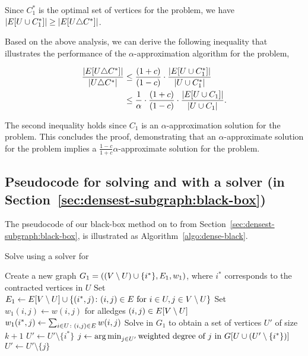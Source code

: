 Since $C_1^*$ is the optimal set of vertices for the \kdense problem, we have $\lvert E[U \cup C_1^*]\rvert \geq \lvert E[U \triangle C^*]\rvert$.

Based on the above analysis, we can derive the following inequality that illustrates the performance of the $\alpha$-approximation algorithm for the \kdense problem,

\begin{equation}
\begin{aligned}
\frac{\lvert E[U \triangle C^*]\rvert}{\lvert U \triangle C^*\rvert} 
&\leq \frac{(1+c)}{(1-c)} \cdot \frac{\lvert E[U \cup C_1^*]\rvert}{\lvert U \cup C_1^*\rvert} \\
&\leq \frac{1}{\alpha} \cdot \frac{(1+c)}{(1-c)} \cdot \frac{\lvert E[U \cup C_1]\rvert}{\lvert U \cup C_1\rvert} .\\
\end{aligned}
\end{equation}

The second inequality holds since $C_1$ is an $\alpha$-approximation solution for the \kdense problem. 
This concludes the proof, demonstrating that an $\alpha$-approximate solution for the \kdense problem implies a $\frac{1-c}{1+c}\alpha$-approximate solution for the \dskc problem.

\subsection{Pseudocode for solving \kdense and \dskc with a \dks solver (in Section~\ref{sec:densest-subgraph:black-box})}
\label{appendix:densest-subgraph:black-box:pseudocode}

The pseudocode of our black-box method on \kdense to \dks
from Section~\ref{sec:densest-subgraph:black-box}, 
is illustrated as Algorithm~\ref{algo:dense-black}.

\begin{algorithm}[H]
\caption{Solve \kdense using a solver for \dks}
\label{algo:dense-black}
\begin{algorithmic}[1]
\State Create a new graph $G_1 = ((V\setminus U)\cup \{i^*\}, E_1, w_1)$,
	where $i^*$ corresponds to the contracted vertices in $U$  
\State Set $E_1 \gets E[V\setminus U] \cup \{ (i^*,j) \colon (i,j)\in E \text{ for } i\in U, j\in V\setminus U\}$
\State Set $w_1(i,j) \gets w(i,j)$ for alledges $(i,j) \in E[V \setminus U]$
\State $w_1(i^*,j) \gets \sum_{i\in U \colon (i,j)\in E} w(i,j)$
\EndFor
\State Solve \dksplus in $G_1$ to obtain a set of vertices $U'$ of size $k+1$
\State $U' \gets U'\setminus \{i^*\}$
\Else
\State $j \gets \operatorname*{arg\,min}_{j\in U'} \text{weighted degree of } j \text{ in } G[U \cup (U' \setminus \{i^*\})]$
\State $U' \gets U' \setminus \{j\}$
\EndIf
\State {}
\end{algorithmic}
\end{algorithm}


